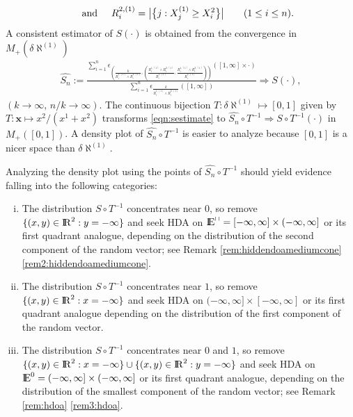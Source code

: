 \documentclass[11 pt]{amsart}
\numberwithin{equation}{section}
\begin{document}
{{\begin{align}
\hskip 0.5 cm \hbox{and} \hskip 0.5 cm  R^{2, (1)}_i = \bigl{|} \bigl\{
  j: X^{(1)}_j \ge X^2_i \bigr\} \bigr{|} \qquad (1\leq i \leq n).
\end{align}
A consistent estimator of $S(\cdot)$ is obtained from the convergence in $M_+(\delta \aleph^{(1)})$
\begin{align}\label{eqn:sestimate}
\hat{S_n} :=
\frac{ \sum_{i=1}^n \epsilon_{\left(\frac{k}{R^{1, (1)}_i \wedge R^{2,
          (1)}_i} , \left(\frac{R^{1, (1)}_i \wedge R^{2,
            (1)}_i}{R^{1, (1)}_i}, \frac{R^{1, (1)}_i \wedge R^{2,
            (1)}_i}{R^{2, (1)}_i} \right) \right)} \left([1, \infty]
    \times \cdot \right)}{\sum_{i=1}^n \epsilon_{\frac{k}{R^{1, (1)}_i
      \wedge R^{2, (1)}_i} }([1, \infty])} \Rightarrow S(\cdot),
\end{align}
$(k \to \infty,\, n/k \to \infty)$. The continuous bijection $T: \delta \aleph^{(1)} \mapsto [0,1]$ given by $T: {\boldsymbol x} \mapsto x^2/(x^1 + x^2)$ transforms \eqref{eqn:sestimate} to 
$\hat{S_n} \circ T^{-1}  \Rightarrow S \circ T^{-1}(\cdot) $ 
in $M_+([0, 1])$. A density  plot of $\hat{S_n} \circ T^{-1}$  {is}
easier to analyze because $[0,1]$ is a nicer space than
$\delta \aleph^{(1)}$. 

Analyzing the density plot using the points of  $\hat{S_n} \circ T^{-1} $
should yield evidence falling into the following categories:
\begin{enumerate}[(i)]
\item The distribution $S \circ T^{-1}$ concentrates near  $0$, so
  remove {$\{(x,y) \in {\mathop{\rm I\kern -0.20em R}\nolimits}^2: y = -\infty\}$} and seek HDA on
  {${\mathop{\rm I\kern -0.20em E}\nolimits}^{\sqcap} = [-\infty, \infty] \times (-\infty, \infty]$ or its
    first quadrant analogue, depending on the distribution of the
    second component of the random vector; 
    see Remark \ref{rem:hiddendoamediumcone}
    \eqref{rem2:hiddendoamediumcone}.} 
\item The distribution $S \circ T^{-1}$ concentrates near   $1$, so
 remove {$\{(x,y) \in {\mathop{\rm I\kern -0.20em R}\nolimits}^2: x = -\infty\}$} and seek HDA on
 {$(-\infty, \infty] \times [-\infty, \infty]$ or its first quadrant
   analogue depending on the distribution of the first component of the random
   vector.} 
  
\item The distribution $S \circ T^{-1}$  concentrates near  $0$ and
  $1$, so  remove {$\{(x,y) \in {\mathop{\rm I\kern -0.20em R}\nolimits}^2: x = -\infty\} \cup \{(x,y) \in
    {\mathop{\rm I\kern -0.20em R}\nolimits}^2: y = -\infty\}$} and seek HDA on {${\mathop{\rm I\kern -0.20em E}\nolimits}^0 = (-\infty, \infty]
    \times (-\infty, \infty]$ or its first quadrant analogue,
    depending on 
the distribution of the smallest
    component of the random vector; see Remark \ref{rem:hdoa}
    \eqref{rem3:hdoa}.} 
  

\end{enumerate}}}
\end{document}
